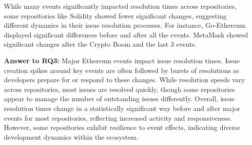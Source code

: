 While many events significantly impacted resolution times across repositories, some repositories like Solidity showed fewer significant changes, suggesting different dynamics in their issue resolution processes. For instance, Go-Ethereum displayed significant differences before and after all the events. MetaMask showed significant changes after the Crypto Boom and the last 3 events.

\begin{tcolorbox}[right=0.1cm,left=0.1cm,top=0.1cm,bottom=0.1cm]
\textbf{Answer to RQ3:} Major Ethereum events impact issue resolution times. Issue creation spikes around key events are often followed by bursts of resolutions as developers prepare for or respond to these changes. While resolution speeds vary across repositories, most issues are resolved quickly, though some repositories appear to manage the number of outstanding issues differently. Overall, issue resolution times change in a statistically significant way before and after major events for most repositories, reflecting increased activity and responsiveness. However, some repositories exhibit resilience to event effects, indicating diverse development dynamics within the ecosystem.
\end{tcolorbox}





